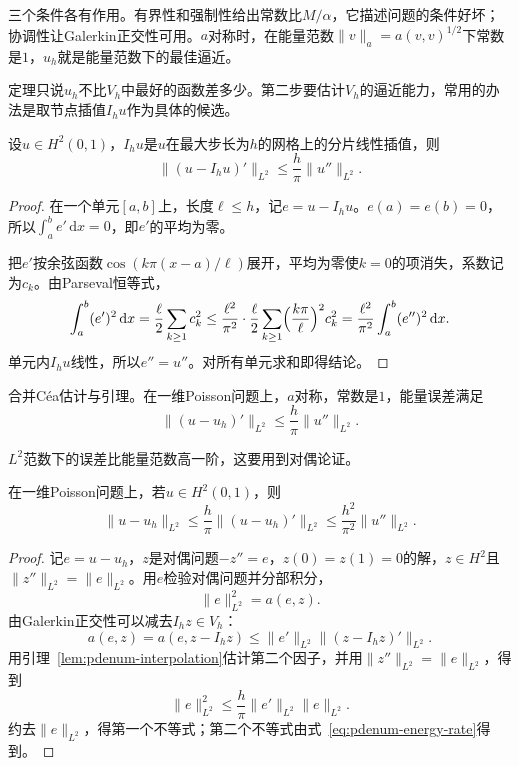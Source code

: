 三个条件各有作用。有界性和强制性给出常数比$M/\alpha$，它描述问题的条件好坏；协调性让Galerkin正交性可用。$a$对称时，在能量范数$\lVert v\rVert_a=a(v,v)^{1/2}$下常数是$1$，$u_h$就是能量范数下的最佳逼近。

定理只说$u_h$不比$V_h$中最好的函数差多少。第二步要估计$V_h$的逼近能力，常用的办法是取节点插值$I_hu$作为具体的候选。

\begin{lemma}[分片线性插值误差]
 \label{lem:pdenum-interpolation}
 设$u\in H^2(0,1)$，$I_hu$是$u$在最大步长为$h$的网格上的分片线性插值，则
 \begin{equation}
  \lVert(u-I_hu)'\rVert_{L^2}\leq\frac{h}{\pi}\lVert u''\rVert_{L^2} .
  \label{eq:pdenum-interpolation}
 \end{equation}
\end{lemma}

\begin{proof}
 在一个单元$[a,b]$上，长度$\ell\leq h$，记$e=u-I_hu$。$e(a)=e(b)=0$，所以$\int_a^be'\,\mathrm{d}x=0$，即$e'$的平均为零。

 把$e'$按余弦函数$\cos(k\pi(x-a)/\ell)$展开，平均为零使$k=0$的项消失，系数记为$c_k$。由Parseval恒等式，
 \[
  \int_a^b(e')^2\,\mathrm{d}x=\frac{\ell}{2}\sum_{k\geq1}c_k^2\leq\frac{\ell^2}{\pi^2}\cdot\frac{\ell}{2}\sum_{k\geq1}\Bigl(\frac{k\pi}{\ell}\Bigr)^2c_k^2=\frac{\ell^2}{\pi^2}\int_a^b(e'')^2\,\mathrm{d}x .
 \]
 单元内$I_hu$线性，所以$e''=u''$。对所有单元求和即得结论。
\end{proof}

合并Céa估计与引理。在一维Poisson问题上，$a$对称，常数是$1$，能量误差满足
\begin{equation}
 \lVert(u-u_h)'\rVert_{L^2}\leq\frac{h}{\pi}\lVert u''\rVert_{L^2} .
 \label{eq:pdenum-energy-rate}
\end{equation}

$L^2$范数下的误差比能量范数高一阶，这要用到对偶论证。

\begin{theorem}[$L^2$误差]
 \label{thm:pdenum-l2}
 在一维Poisson问题上，若$u\in H^2(0,1)$，则
 \begin{equation}
  \lVert u-u_h\rVert_{L^2}\leq\frac{h}{\pi}\lVert(u-u_h)'\rVert_{L^2}\leq\frac{h^2}{\pi^2}\lVert u''\rVert_{L^2} .
  \label{eq:pdenum-l2-rate}
 \end{equation}
\end{theorem}

\begin{proof}
 记$e=u-u_h$，$z$是对偶问题$-z''=e$，$z(0)=z(1)=0$的解，$z\in H^2$且$\lVert z''\rVert_{L^2}=\lVert e\rVert_{L^2}$。用$e$检验对偶问题并分部积分，
 \[
  \lVert e\rVert_{L^2}^2=a(e,z) .
 \]
 由Galerkin正交性可以减去$I_hz\in V_h$：
 \[
  a(e,z)=a(e,z-I_hz)\leq\lVert e'\rVert_{L^2}\lVert(z-I_hz)'\rVert_{L^2} .
 \]
 用引理~\ref{lem:pdenum-interpolation}估计第二个因子，并用$\lVert z''\rVert_{L^2}=\lVert e\rVert_{L^2}$，得到
 \[
  \lVert e\rVert_{L^2}^2\leq\frac{h}{\pi}\lVert e'\rVert_{L^2}\lVert e\rVert_{L^2} .
 \]
 约去$\lVert e\rVert_{L^2}$，得第一个不等式；第二个不等式由式~\eqref{eq:pdenum-energy-rate}得到。
\end{proof}

